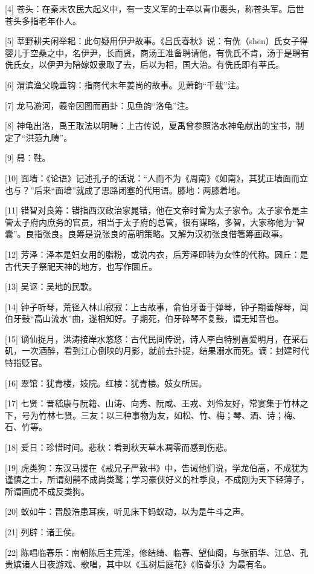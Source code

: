\documentclass[12pt,UTF8]{ctexbook}
\begin{document}
[4] 苍头：在秦末农民大起义中，有一支义军的士卒以青巾裹头，称苍头军。后世苍头多指老年仆人。

[5] 莘野耕夫闲举耜：此句疑用伊尹故事。《吕氏春秋》说：有侁（shēn）氏女子得婴儿于空桑之中，名伊尹，长而贤，商汤王准备聘请他，有侁氏不肯，汤于是聘有侁氏女，以伊尹为陪嫁奴隶取了去，后以为相，国大治。有侁氏即有莘氏。

[6] 渭滨渔父晚垂钩：指商代末年姜尚的故事。见萧韵“千载”注。

[7] 龙马游河，羲帝因图而画卦：见鱼韵“洛龟”注。

[8] 神龟出洛，禹王取法以明畴：上古传说，夏禹曾参照洛水神龟献出的宝书，制定了“洪范九畴”。

[9] 舄：鞋。

[10] 面墙：《论语》记述孔子的话说：“人而不为《周南》《如南》，其犹正墙面而立也与？”后来“面墙”就成了思路闭塞的代用语。膝地：两膝着地。

[11] 错智对良筹：错指西汉政治家晁错，他在文帝时曾为太子家令。太子家令是主管太子府内庶务的官员，相当于太子府的总管，很有谋略，多智，大家称他为“智囊”。良指张良。良筹是说张良的高明策略。又解为汉初张良借箸筹画政事。

[12] 芳泽：泽本是妇女用的脂粉，或说内衣，后芳泽即转为女性的代称。圆丘：是古代天子祭祀天神的地方，也写作圜丘。

[13] 吴讴：吴地的民歌。

[14] 钟子听琴，荒径入林山寂寂：上古故事，俞伯牙善于弹琴，钟子期善解琴，闻伯牙鼓“高山流水”曲，遂相知好。子期死，伯牙碎琴不复鼓，谓无知音也。

[15] 谪仙捉月，洪涛接岸水悠悠：古代民间传说，诗人李白特别喜爱明月，在采石矶，一次酒醉，看到江心倒映的月影，就前去扑捉，结果溺水而死。谪：封建时代特指贬官。

[16] 翠馆：犹青楼，妓院。红楼：犹青楼。妓女所居。

[17] 七贤：晋嵇康与阮籍、山涛、向秀、阮咸、王戎、刘伶友好，常宴集于竹林之下，号为竹林七贤。三友：以三种事物为友，如松、竹、梅；琴、酒、诗；梅、石、竹等。

[18] 爱日：珍惜时间。悲秋：看到秋天草木凋零而感到伤悲。

[19] 虎类狗：东汉马援在《戒兄子严敦书》中，告诫他们说，学龙伯高，不成犹为谨慎之士，所谓刻鹄不成尚类鹜；学习豪侠好义的杜季良，不成刚为天下轻薄子，所谓画虎不成反类狗。

[20] 蚁如牛：晋殷浩患耳疾，听见床下蚂蚁动，以为是牛斗之声。

[21] 列辟：诸王侯。

[22] 陈唱临春乐：南朝陈后主荒淫，修结绮、临春、望仙阁，与张丽华、江总、孔贵嫔诸人日夜游戏、歌唱，其中以《玉树后庭花》《临春乐》为最有名。
\end{document}
